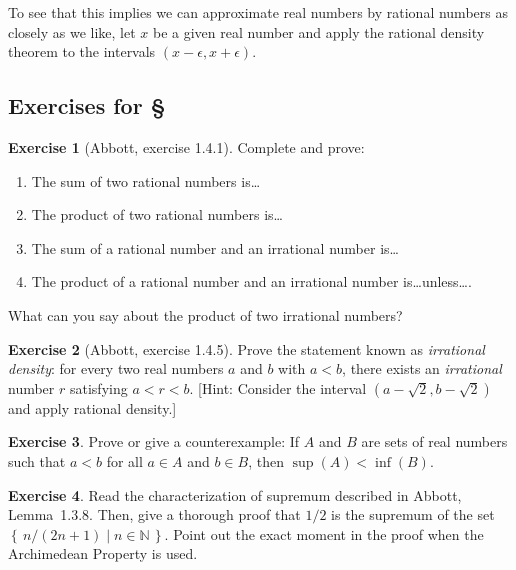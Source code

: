 \documentclass[11pt,oneside]{amsbook}
\newcommand{\set}[1]{\left\{\,#1\,\right\}}
\newcommand{\NN}{\mathbb N}
\theoremstyle{definition}
\newtheorem{exerc}{Exercise}[section]
\theoremstyle{plain}
\theoremstyle{definition}
\theoremstyle{remark}
\numberwithin{equation}{section}
\numberwithin{figure}{section}
\begin{document}
To see that this implies we can approximate real numbers by rational numbers as closely as we like, let $x$ be a given real number and apply the rational density theorem to the intervals $(x-\epsilon,x+\epsilon)$.

\newpage
\subsection*{Exercises for \S\thesection}


\begin{exerc}[Abbott, exercise 1.4.1]
  Complete and prove:
  \begin{enumerate}
    \item The sum of two rational numbers is\ldots
    \item The product of two rational numbers is\ldots
    \item The sum of a rational number and an irrational number is\ldots
    \item The product of a rational number and an irrational number is\ldots unless\ldots.
  \end{enumerate}
  What can you say about the product of two irrational numbers?
\end{exerc}

\begin{exerc}[Abbott, exercise 1.4.5]
  Prove the statement known as \emph{irrational density}: for every two real numbers $a$ and $b$ with $a<b$, there exists an \emph{irrational} number $r$ satisfying $a<r<b$. [Hint: Consider the interval $(a-\sqrt{2},b-\sqrt{2})$ and apply rational density.]
\end{exerc}

\begin{exerc}
  Prove or give a counterexample: If $A$ and $B$ are sets of real numbers such that $a<b$ for all $a\in A$ and $b\in B$, then $\sup(A)<\inf(B)$.
\end{exerc}

\begin{exerc}
  Read the characterization of supremum described in Abbott, Lemma~1.3.8. Then, give a thorough proof that $1/2$ is the supremum of the set $\set{n/(2n+1)\mid n\in\NN}$. Point out the exact moment in the proof when the Archimedean Property is used.
\end{exerc}
\end{document}
